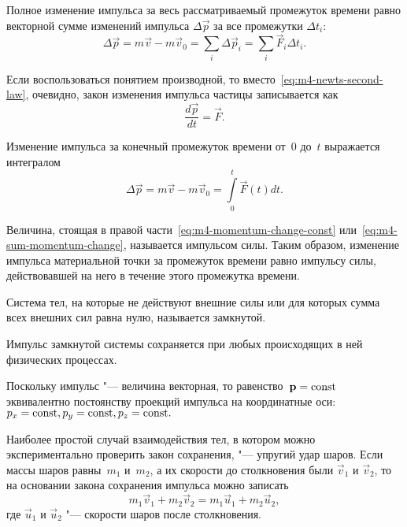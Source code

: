 \documentclass[a4paper, 12pt]{extarticle}
\newcommand{\issum}{\sum\limits_{i}}
\begin{document}
Полное изменение импульса за весь рассматриваемый промежуток времени равно векторной сумме изменений импульса $\Delta \vec p$ за все промежутки $\Delta t_i$: %
\begin{equation}
\label{eq:m4-sum-momentum-change}
\Delta \vec p = m \vec v - m \vec v_0 = \issum \Delta \vec p_i = \issum \vec F_i \Delta t_i.
\end{equation}

Если воспользоваться понятием производной, то вместо~\eqref{eq:m4-newts-second-law}, очевидно, закон изменения импульса частицы записывается как
\begin{equation}
\label{eq:m4-momentum-change-via-drvt}
\frac{d \vec p}{d t} = \vec F .
\end{equation}

Изменение импульса за конечный промежуток времени от~0 до~$t$ выражается интегралом
\begin{equation}
\label{eq:m4-total-momentum-change-via-int}
\Delta \vec p = m \vec v - m \vec v_0 = \int\limits_0^t \vec F(t) d t.
\end{equation}

Величина, стоящая в правой части~\eqref{eq:m4-momentum-change-const} или~\eqref{eq:m4-sum-momentum-change}, называется импульсом силы. Таким образом, изменение импульса материальной точки за промежуток времени равно импульсу силы, действовавшей на него в течение этого промежутка времени.

Система тел, на которые не действуют внешние силы или для которых сумма всех внешних сил равна нулю, называется замкнутой.

Импульс замкнутой системы сохраняется при любых происходящих в ней физических процессах.

Поскольку импульс "--- величина векторная, то равенство~$\mathbf{p} = \textrm{const}$ эквивалентно постоянству проекций импульса на координатные оси: $p_x = \textrm{const}, p_y = \textrm{const}, p_z = \textrm{const}.$

Наиболее простой случай взаимодействия тел, в котором можно экспериментально проверить закон сохранения, "--- упругий удар шаров. Если массы шаров равны~$m_1$ и~$m_2$, а их скорости до столкновения были $\vec v_1$ и $\vec v_2$, то на основании закона сохранения импульса можно записать
\begin{equation}
\label{eq:m4-balls-collision}
m_1 \vec v_1 + m_2 \vec v_2 = m_1 \vec u_1 + m_2 \vec u_2,
\end{equation}
где $\vec u_1$ и $\vec u_2$ "--- скорости шаров после столкновения.
\end{document}

